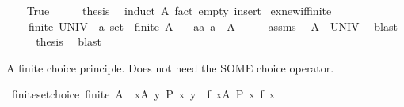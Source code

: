 \begin{isabellebody}
\isanewline
{}\isamarkupfalse%
\isanewline
\ \ \isamarkupfalse%
\ True\isanewline
\ \ \isamarkupfalse%
\ \isamarkupfalse%
\ {\isacharquery}{\kern0pt}thesis\ \isamarkupfalse%
\ {\isacharparenleft}{\kern0pt}induct\ A{\isacharparenright}{\kern0pt}\ {\isacharparenleft}{\kern0pt}fact\ empty\ insert{\isacharparenright}{\kern0pt}{\isacharplus}{\kern0pt}\isanewline
{}\isamarkupfalse%
%
\endisatagproof
{\isafoldproof}%
%
\isadelimproof
%
\endisadelimproof
%
\isadelimdocument
%
\endisadelimdocument
%
\isatagdocument
%
\isamarkuptrue%
%
\endisatagdocument
{\isafolddocument}%
%
\isadelimdocument
%
\endisadelimdocument
{}\isamarkupfalse%
\ ex{\isacharunderscore}{\kern0pt}new{\isacharunderscore}{\kern0pt}if{\isacharunderscore}{\kern0pt}finite{\isacharcolon}{\kern0pt}\ %
\isanewline
\ \ \ {\isachardoublequoteopen}{\isasymnot}\ finite\ {\isacharparenleft}{\kern0pt}UNIV\ {\isacharcolon}{\kern0pt}{\isacharcolon}{\kern0pt}\ {\isacharprime}{\kern0pt}a\ set{\isacharparenright}{\kern0pt}{\isachardoublequoteclose}\ \ {\isachardoublequoteopen}finite\ A{\isachardoublequoteclose}\isanewline
\ \ \ {\isachardoublequoteopen}{\isasymexists}a{\isacharcolon}{\kern0pt}{\isacharcolon}{\kern0pt}{\isacharprime}{\kern0pt}a{\isachardot}{\kern0pt}\ a\ {\isasymnotin}\ A{\isachardoublequoteclose}\isanewline
%
\isadelimproof
%
\endisadelimproof
%
\isatagproof
{}\isamarkupfalse%
\ {\isacharminus}{\kern0pt}\isanewline
\ \ \isamarkupfalse%
\ assms\ \isamarkupfalse%
\ {\isachardoublequoteopen}A\ {\isasymnoteq}\ UNIV{\isachardoublequoteclose}\ \isamarkupfalse%
\ blast\isanewline
\ \ \isamarkupfalse%
\ \isamarkupfalse%
\ {\isacharquery}{\kern0pt}thesis\ \isamarkupfalse%
\ blast\isanewline
{}\isamarkupfalse%
%
\endisatagproof
{\isafoldproof}%
%
\isadelimproof
%
\endisadelimproof
%
\begin{isamarkuptext}%
A finite choice principle. Does not need the SOME choice operator.%
\end{isamarkuptext}\isamarkuptrue%
\isamarkupfalse%
\ finite{\isacharunderscore}{\kern0pt}set{\isacharunderscore}{\kern0pt}choice{\isacharcolon}{\kern0pt}\ {\isachardoublequoteopen}finite\ A\ {\isasymLongrightarrow}\ {\isasymforall}x{\isasymin}A{\isachardot}{\kern0pt}\ {\isasymexists}y{\isachardot}{\kern0pt}\ P\ x\ y\ {\isasymLongrightarrow}\ {\isasymexists}f{\isachardot}{\kern0pt}\ {\isasymforall}x{\isasymin}A{\isachardot}{\kern0pt}\ P\ x\ {\isacharparenleft}{\kern0pt}f\ x{\isacharparenright}{\kern0pt}{\isachardoublequoteclose}\isanewline

\end{isabellebody}
